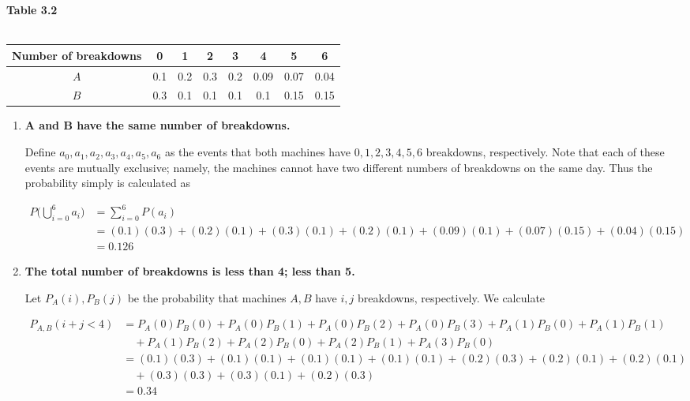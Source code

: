 \documentclass[10pt, oneside]{article}   	%
\theoremstyle{definition}
\begin{document}
\begin{enumerate}[label=3.\arabic*]
\begin{center}
\textbf{Table 3.2} \\
\textbf{ }\\
\renewcommand{\arraystretch}{3.5}
\begin{tabular}{c || c c c c c c c} 
 \hline
 Number of breakdowns & 0 & 1 & 2 & 3 & 4 & 5 & 6 \\
 \hline
$A$ & 0.1 & 0.2 & 0.3 & 0.2 & 0.09 & 0.07 & 0.04 \\
 \hline
$B$ & 0.3 & 0.1 & 0.1 & 0.1 & 0.1 & 0.15 & 0.15 \\
 \hline
\end{tabular}
\end{center}

	\begin{enumerate}
	\item  \begin{tcolorbox}[
	  colback=Cerulean!5!white,
	  colframe=Cerulean!75!black]
	\textbf{$\bm{A}$ and $\bm{B}$ have the same number of breakdowns.}
	\end{tcolorbox}
	
	Define $a_0, a_1, a_2, a_3, a_4, a_5, a_6$ as the events that both machines have $0, 1, 2, 3, 4, 5, 6$ breakdowns, respectively. Note that each of these events are mutually exclusive; namely, the machines cannot have two different numbers of breakdowns on the same day. Thus the probability simply is calculated as
	
	\begin{align*}
	P\Bigg( \bigcup^6_{i = 0} a_i \Bigg) &= \sum^6_{i = 0} P(a_i) \\
	&= (0.1)(0.3) + (0.2)(0.1) + (0.3)(0.1) + (0.2)(0.1) + (0.09)(0.1) + (0.07)(0.15) + (0.04)(0.15) \\
	&= \boxed{0.126}
	\end{align*}
	
	\item  \begin{tcolorbox}[
	  colback=Cerulean!5!white,
	  colframe=Cerulean!75!black]
	\textbf{The total number of breakdowns is less than 4; less than 5.}
	\end{tcolorbox}
	
	Let $P_A(i), P_B(j)$ be the probability that machines $A, B$ have $i, j$ breakdowns, respectively. We calculate
	
	\textbf{}
	
	\begin{align*}
	P_{A,B}(i + j < 4) &= P_A(0) P_B(0) + P_A(0) P_B(1) + P_A(0) P_B(2) + P_A(0) P_B(3) + P_A(1) P_B(0) + P_A(1) P_B(1) \\
	&\quad + P_A(1) P_B(2) + P_A(2) P_B(0) + P_A(2) P_B(1) + P_A(3) P_B(0) \\
	&= (0.1)(0.3) + (0.1)(0.1) + (0.1)(0.1) + (0.1)(0.1) + (0.2)(0.3) + (0.2)(0.1) + (0.2)(0.1) \\ 
	&\quad+ (0.3)(0.3) + (0.3)(0.1) + (0.2)(0.3) \\
	&= \boxed{0.34}
	\end{align*}
	

\end{enumerate}
\end{enumerate}
\end{document}
